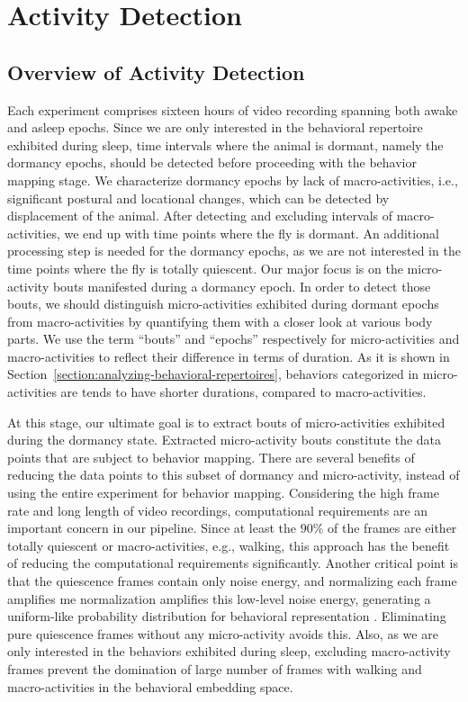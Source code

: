\chapter{Activity Detection}

\section{Overview of Activity Detection}

Each experiment comprises sixteen hours of video recording spanning both awake and asleep epochs.
Since we are only interested in the behavioral repertoire exhibited during sleep, time intervals where the animal is dormant, namely the dormancy epochs, should be detected before proceeding with the behavior mapping stage.
We characterize dormancy epochs by lack of macro-activities, i.e., significant postural and locational changes, which can be detected by displacement of the animal.
After detecting and excluding intervals of macro-activities, we end up with time points where the fly is dormant.
An additional  processing step is needed for the dormancy epochs, as we are not interested in the time points where the fly is totally quiescent.
Our major focus is on the micro-activity bouts manifested during a dormancy epoch.
In order to detect those bouts, we should distinguish micro-activities exhibited during dormant epochs from macro-activities by quantifying them with a closer look at various body parts. We use the term ``bouts'' and ``epochs'' respectively for micro-activities and macro-activities to reflect their difference in terms of duration. As it is shown in Section~\ref{section:analyzing-behavioral-repertoires}, behaviors categorized in micro-activities are tends to have shorter durations, compared to macro-activities.

At this stage, our ultimate goal is to extract bouts of micro-activities exhibited during the dormancy state.
Extracted micro-activity bouts constitute the data points that are subject to behavior mapping.
There are several benefits of reducing the data points to this subset of dormancy and micro-activity, instead of using the entire experiment for behavior mapping.
Considering the high frame rate and long length of video recordings, computational requirements are an important concern in our pipeline.
Since  at least the $90\%$ of the frames are either totally quiescent or macro-activities, e.g., walking, this approach has the benefit of reducing the computational requirements significantly.
Another critical point is that the quiescence frames contain only noise energy, and normalizing each frame amplifies me normalization amplifies this low-level noise energy, generating a uniform-like probability distribution for behavioral representation \citep{todd_systematic_2017}.
Eliminating pure quiescence frames without any micro-activity avoids this.
Also, as we are only interested in the behaviors exhibited during sleep, excluding macro-activity frames prevent the domination of large number of frames with walking and macro-activities in the behavioral embedding space.

